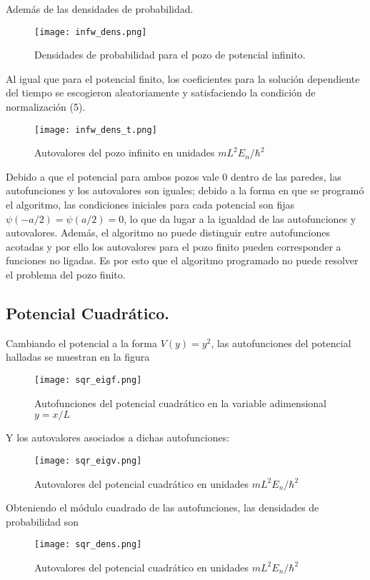 \documentclass{article}
\begin{document}
\newpage
Además de las densidades de probabilidad.

\begin{figure}[htp]
    \centering
    \texttt{[image: infw\_dens.png]}
    \caption{Densidades de probabilidad para el pozo de potencial infinito.}
    \label{fig:my_label}
\end{figure}

Al igual que para el potencial finito, los coeficientes para la solución dependiente del tiempo se escogieron aleatoriamente y satisfaciendo la condición de normalización (5).

\begin{figure}[htp]
    \centering
    \texttt{[image: infw\_dens\_t.png]}
    \caption{Autovalores del pozo infinito en unidades $mL^2E_n/\hbar^2$}
    \label{fig:my_label}
\end{figure}


Debido a que el potencial para ambos pozos vale $0$ dentro de las paredes, las autofunciones y los autovalores son iguales; debido a la forma en que se programó el algoritmo, las condiciones iniciales para cada potencial son fijas $\psi(-a/2)=\psi(a/2)=0$, lo que da lugar a la igualdad de las autofunciones y autovalores. Además, el algoritmo no puede distinguir entre autofunciones acotadas y por ello los autovalores para el pozo finito pueden corresponder a funciones no ligadas. Es por esto que el algoritmo programado no puede resolver el problema del pozo finito.

\subsection{Potencial Cuadrático.}

Cambiando el potencial a la forma $V(y)=y^2$, las autofunciones del potencial halladas se muestran en la figura

\newpage
\begin{figure}[h]
\centering
\texttt{[image: sqr\_eigf.png]}
\caption{Autofunciones del potencial cuadrático en la variable adimensional $y=x/L$}
    \label{fig:my_label}
\end{figure}

Y los autovalores asociados a dichas autofunciones:

\begin{figure}[htp]
    \centering
    \texttt{[image: sqr\_eigv.png]}
    \caption{Autovalores del potencial cuadrático en unidades $mL^2E_n/\hbar^2$}
    \label{fig:my_label}
\end{figure}

\newpage
Obteniendo el módulo cuadrado de las autofunciones, las densidades de probabilidad son

\begin{figure}[h]
    \centering
    \texttt{[image: sqr\_dens.png]}
    \caption{Autovalores del potencial cuadrático en unidades $mL^2E_n/\hbar^2$}
    \label{fig:my_label}
\end{figure}
\end{document}
